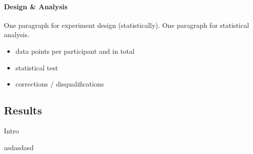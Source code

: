 \paragraph{Design \& Analysis}
One paragraph for experiment design (statistically).\medskip\newline
One paragraph for statistical analysis.\newline
\begin{itemize}
	\item data points per participant and in total
	\item statistical test
	\item corrections / disqualifications
\end{itemize}


\subsection{Results}
Intro \newline

asdasdasd